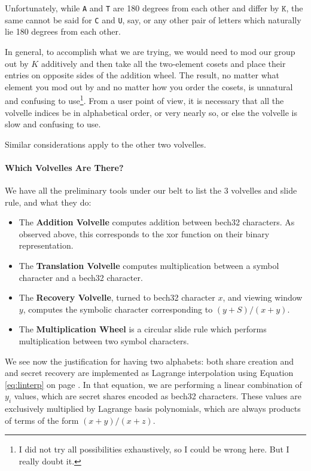 \documentclass[letterpaper]{article}
\theoremstyle{xxx}
\theoremstyle{evil}
\theoremstyle{yyy}
\theoremstyle{plain}
\theoremstyle{zzz}
\begin{document}
Unfortunately, while \texttt{A} and \texttt{T} are 180 degrees from each other and
differ by $\texttt{K}$, the same cannot be said for \texttt{C} and \texttt{U}, say,
or any other pair of letters which naturally lie 180 degrees from each other.
 
In general, to accomplish what we are trying, we would need to mod our group out by $K$ additively
and then take all the two-element cosets and place their entries on opposite sides
of the addition wheel. The result, no matter what element you mod out by and no matter
how you order the cosets, is unnatural and confusing to use\footnote{I did not try
all possibilities exhaustively, so I could be wrong here. But I really doubt it.}.
From a user point of view, it is necessary that all the volvelle indices be in
alphabetical order, or very nearly so, or else the volvelle is slow and confusing
to use.

Similar considerations apply to the other two volvelles.

\paragraph{Which Volvelles Are There?} We have all the preliminary tools under
our belt to list the 3 volvelles and slide rule, and what they do:

\begin{itemize}
\item The \textbf{Addition Volvelle} computes addition between bech32 characters.
As observed above, this corresponds to the xor function on their binary representation.
\item The \textbf{Translation Volvelle} computes multiplication between a symbol
character and a bech32 character. 
\item The \textbf{Recovery Volvelle}, turned to bech32 character $x$, and viewing
window $y$, computes the symbolic character corresponding to $(y + S)/(x + y)$.
\item The \textbf{Multiplication Wheel} is a circular slide rule which performs
multiplication between two symbol characters.
\end{itemize}

We see now the justification for having two alphabets: both share creation and
and secret recovery are implemented as Lagrange interpolation using Equation
\eqref{eq:linterp} on page \pageref{eq:linterp}. In that equation, we are performing
a linear combination of $y_i$ values, which are secret shares encoded as bech32
characters. These values are exclusively multiplied by Lagrange basis polynomials,
which are always products of terms of the form $(x + y)/(x + z)$.
\end{document}
